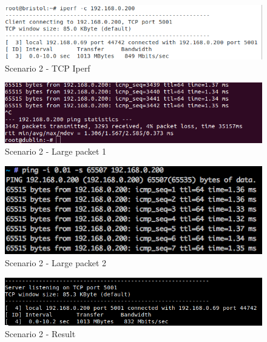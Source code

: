 \documentclass{article}
\begin{document}
\begin{figure}[H]
\includegraphics[width=14cm]{figures/q2-2-2-1.png}
\centering
\caption{Scenario 2 - TCP Iperf}
\centering
\label{fig:throughput_scenario_2}
\end{figure}

\begin{figure}[H]
\includegraphics[width=14cm]{figures/q2-2-2-ping-2.png}
\centering
\caption{Scenario 2 - Large packet 1}
\centering
\label{fig:throughput_scenario_2_ping_1}
\end{figure}

\begin{figure}[H]
\includegraphics[width=14cm]{figures/q2-2-2-ping-1.png}
\centering
\caption{Scenario 2 - Large packet 2}
\centering
\label{fig:throughput_scenario_2_ping_2}
\end{figure}


\begin{figure}[H]
\includegraphics[width=14cm]{figures/q2-2-2-result.png}
\centering
\caption{Scenario 2 - Result}
\centering
\label{fig:throughput_scenario_2_result}
\end{figure}
\end{document}
